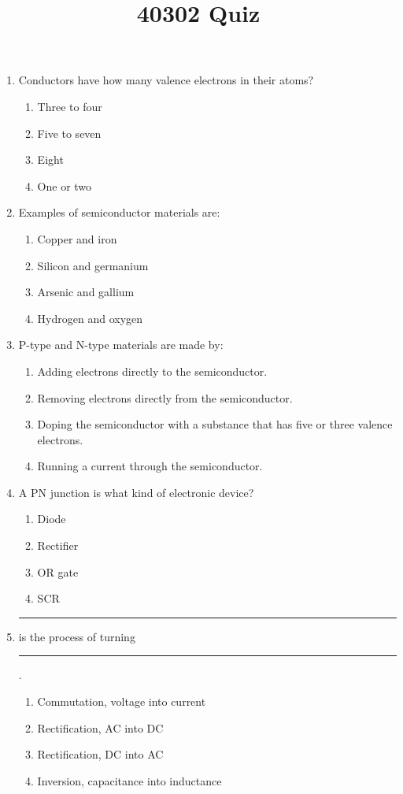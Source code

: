 \documentclass[10pt]{article}
\title{40302 Quiz}
\begin{document}
\begin{multicols}{2}
\begin{enumerate}
\item Conductors have how many valence electrons in their atoms?
	\begin{enumerate}
	\item Three to four
	\item Five to seven
	\item Eight
	\item One or two
	\end{enumerate}
\item Examples of semiconductor materials are:
	\begin{enumerate}
	\item Copper and iron
	\item Silicon and germanium
	\item Arsenic and gallium
	\item Hydrogen and oxygen
	\end{enumerate}
\item P-type and N-type materials are made by:
	\begin{enumerate}
	\item Adding electrons directly to the semiconductor.
	\item Removing electrons directly from the semiconductor.
	\item Doping the semiconductor with a substance that has five or three valence electrons.
	\item Running a current through the semiconductor.
	\end{enumerate}
\item A PN junction is what kind of electronic device?
	\begin{enumerate}
	\item Diode
	\item Rectifier
	\item OR gate
	\item SCR
	\end{enumerate}
\item \rule{1cm}{0.15mm} is the process of turning \rule{1cm}{0.15mm}.
	\begin{enumerate}
	\item Commutation, voltage into current
	\item Rectification, AC into DC
	\item Rectification, DC into AC
	\item Inversion, capacitance into inductance
	\end{enumerate}

\end{enumerate}
\end{multicols}
\end{document}
